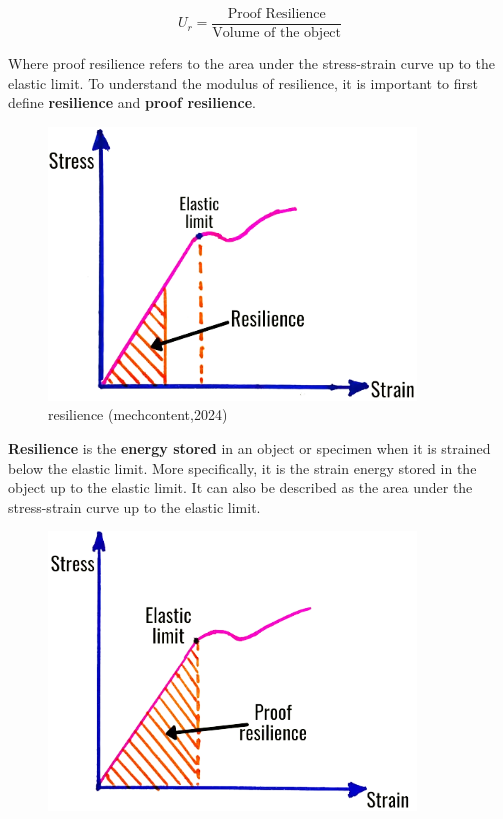 \documentclass{article}
\begin{document}
\begin{equation}
    U_r = \frac{\text{Proof Resilience}}{\text{Volume of the object}}
\end{equation}

Where proof resilience refers to the area under the stress-strain curve up to the elastic limit. To understand the modulus of resilience, it is important to first define \textbf{resilience} and \textbf{proof resilience}.

\begin{center}
\begin{minipage}[t]{0.46\textwidth}
\begin{figure}[H]
    \centering
    \includegraphics[width=0.87\textwidth]{images/resilience-1.png}
    \caption{resilience (mechcontent,2024)}
    \label{fig:resilience}
\end{figure}
\textbf{Resilience} is the \textbf{energy stored} in an object or specimen when it is strained below the elastic limit. More specifically, it is the strain energy stored in the object up to the elastic limit. It can also be described as the area under the stress-strain curve up to the elastic limit.
\end{minipage}\hfil
\begin{minipage}[t]{0.46\textwidth}
\begin{figure}[H]
    \centering
    \includegraphics[width=0.87\textwidth]{images/proof-resilience-1.png}

\end{figure}
\end{minipage}
\end{center}
\end{document}
